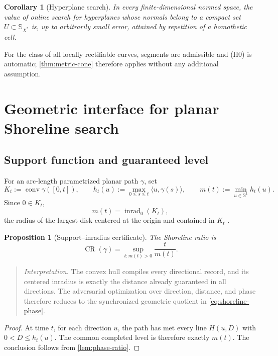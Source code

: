 \documentclass[10pt,a4paper]{article}
\newtheorem{proposition}[proposition]{Proposition}
\newtheorem{corollary}[corollary]{Corollary}
\theoremstyle{definition}
\theoremstyle{remark}
\DeclareMathOperator{\conv}{conv}
\DeclareMathOperator{\inrad}{inrad}
\DeclareMathOperator{\CR}{CR}
\newcommand{\Sph}{\mathbb{S}}
\newcommand{\ip}[2]{\langle #1,#2\rangle}
\begin{document}
\begin{corollary}[Hyperplane search]
\label{cor:hyperplane}
In every finite-dimensional normed space, the value of online search for hyperplanes whose normals belong to a compact set $U\subset\Sph_{X^*}$ is, up to arbitrarily small error, attained by repetition of a homothetic cell.
\end{corollary}

For the class of all locally rectifiable curves, segments are admissible and (H0) is automatic; \cref{thm:metric-cone} therefore applies without any additional assumption.

\section{Geometric interface for planar Shoreline search}
\subsection{Support function and guaranteed level}
For an arc-length parametrized planar path $\gamma$, set
\begin{equation}
K_t:=\conv\gamma([0,t]),
\qquad
h_t(u):=\max_{0\le s\le t}\ip{u}{\gamma(s)},
\qquad
m(t):=\min_{u\in\Sph^1}h_t(u).
\label{eq:support-level}
\end{equation}
Since $0\in K_t$,
\[
m(t)=\inrad_0(K_t),
\]
the radius of the largest disk centered at the origin and contained in $K_t$ \cite{Schneider}.

\begin{proposition}[Support--inradius certificate]
\label{prop:support-certificate}
The Shoreline ratio is
\begin{equation}
\CR(\gamma)=\sup_{t:m(t)>0}\frac{t}{m(t)}.
\label{eq:shoreline-phase}
\end{equation}
\end{proposition}

\begin{quote}\small
\textit{Interpretation.} The convex hull compiles every directional record, and its centered inradius is exactly the distance already guaranteed in all directions. The adversarial optimization over direction, distance, and phase therefore reduces to the synchronized geometric quotient in \eqref{eq:shoreline-phase}.
\end{quote}

\begin{proof}
At time $t$, for each direction $u$, the path has met every line $H(u,D)$ with $0<D\le h_t(u)$. The common completed level is therefore exactly $m(t)$. The conclusion follows from \cref{lem:phase-ratio}.
\end{proof}
\end{document}
